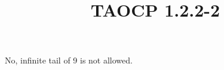 \documentclass{article}
\title{TAOCP 1.2.2\mbox{-}2}
\begin{document}
\maketitle

No, infinite tail of 9 is not allowed.
\end{document}
